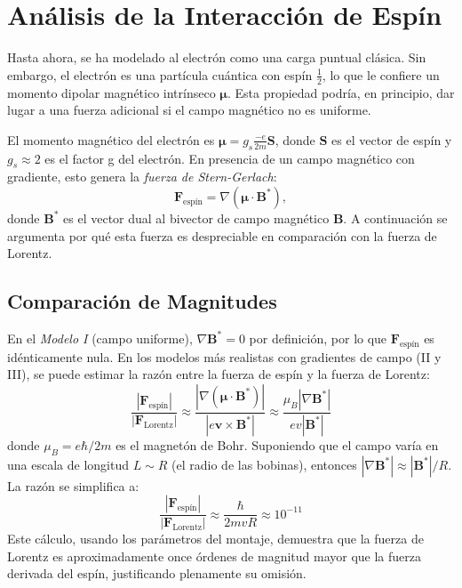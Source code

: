 \section{Análisis de la Interacción de Espín}
\label{ssec:modelo_spin}

Hasta ahora, se ha modelado al electrón como una carga puntual clásica. Sin
embargo, el electrón es una partícula cuántica con espín $\frac{1}{2}$, lo
que le confiere un momento dipolar magnético intrínseco $\boldsymbol{\mu}$.
Esta propiedad podría, en principio, dar lugar a una fuerza adicional si el
campo magnético no es uniforme.

El momento magnético del electrón es $\boldsymbol{\mu} = g_s \frac{-e}{2m} \boldsymbol{S}$,
donde $\boldsymbol{S}$ es el vector de espín y $g_s \approx 2$ es el
factor g del electrón. En presencia de un campo magnético con gradiente,
esto genera la \emph{fuerza de Stern-Gerlach}:
%
\begin{equation}
	\boldsymbol{F}_{\text{espín}} = \nabla (\boldsymbol{\mu} \cdot \boldsymbol{B}^*),
	\label{eq:fuerza_spin}
\end{equation}
%
donde $\boldsymbol{B}^*$ es el vector dual al bivector de campo magnético
$\boldsymbol{B}$. A continuación se argumenta por qué esta fuerza es
despreciable en comparación con la fuerza de Lorentz.

\subsection{Comparación de Magnitudes}

En el \emph{Modelo I} (campo uniforme), $\nabla \boldsymbol{B}^* = 0$ por
definición, por lo que $\boldsymbol{F}_{\text{espín}}$ es idénticamente
nula. En los modelos más realistas con gradientes de campo (II y III), se
puede estimar la razón entre la fuerza de espín y la fuerza de Lorentz:
%
$$
\frac{|\boldsymbol{F}_{\text{espín}}|}{|\boldsymbol{F}_{\text{Lorentz}}|}
\approx \frac{|\nabla (\boldsymbol{\mu} \cdot \boldsymbol{B}^*)|}
{|e\boldsymbol{v} \times \boldsymbol{B}^*|}
\approx \frac{\mu_B |\nabla \boldsymbol{B}^*|}{e v |\boldsymbol{B}^*|}
$$
%
donde $\mu_B = e\hbar/2m$ es el magnetón de Bohr. Suponiendo que el campo
varía en una escala de longitud $L \sim R$ (el radio de las bobinas),
entonces $|\nabla \boldsymbol{B}^*| \approx |\boldsymbol{B}^*|/R$. La razón se
simplifica a:
%
$$
\frac{|\boldsymbol{F}_{\text{espín}}|}{|\boldsymbol{F}_{\text{Lorentz}}|}
\approx \frac{\hbar}{2m v R} \approx 10^{-11}
$$
%
Este cálculo, usando los parámetros del montaje, demuestra que la fuerza
de Lorentz es aproximadamente once órdenes de magnitud mayor que la
fuerza derivada del espín, justificando plenamente su omisión.

